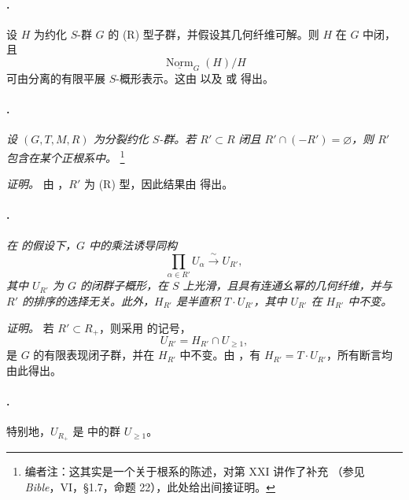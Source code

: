 \paragraph{.}
设 \(H\) 为约化 \(S\)-群 \(G\) 的 \textup{(R)} 型子群，并假设其几何纤维可解。则 \(H\) 在 \(G\) 中闭，且
\[
  \underline{\operatorname{Norm}}_G(H)/H
\]
可由分离的有限平展 \(S\)-概形表示。这由  以及  或 \textup{} 得出。

\paragraph{.}
\textit{设 \((G,T,M,R)\) 为分裂约化 \(S\)-群。若 \(R'\subset R\) 闭且 \(R'\cap(-R')=\varnothing\)，则 \(R'\) 包含在某个正根系中。}
\footnote{编者注：这其实是一个关于根系的陈述，对第 XXI 讲作了补充 \textup{（参见 \emph{Bible}，VI，\S1.7，命题 22）}，此处给出间接证明。}

\textit{证明。}
由 ，\(R'\) 为 \textup{(R)} 型，因此结果由  得出。

\paragraph{.}
\textit{在  的假设下，\(G\) 中的乘法诱导同构}
\[
  \prod_{\alpha\in R'}U_\alpha
  \xrightarrow{\ \sim\ } U_{R'},
\]
\textit{其中 \(U_{R'}\) 为 \(G\) 的闭群子概形，在 \(S\) 上光滑，且具有连通幺幂的几何纤维，并与 \(R'\) 的排序的选择无关。此外，\(H_{R'}\) 是半直积 \(T\cdot U_{R'}\)，其中 \(U_{R'}\) 在 \(H_{R'}\) 中不变。}

\textit{证明。}
若 \(R'\subset R_+\)，则采用  的记号，
\[
  U_{R'}=H_{R'}\cap U_{\geq1},
\]
是 \(G\) 的有限表现闭子群，并在 \(H_{R'}\) 中不变。由 \textup{}，有 \(H_{R'}=T\cdot U_{R'}\)，所有断言均由此得出。

\paragraph{.}
特别地，\(U_{R_+}\) 是  中的群 \(U_{\geq1}\)。

